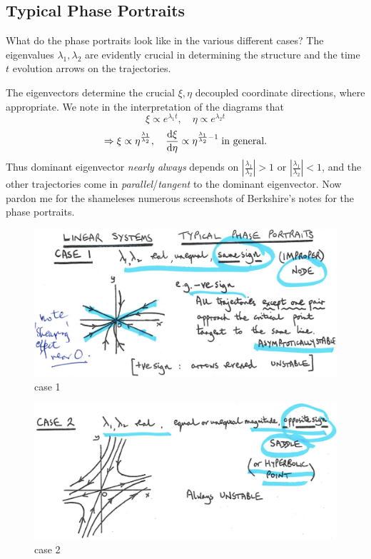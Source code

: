 \documentclass[12pt]{report}
\theoremstyle{definition}
\begin{document}
\subsection{Typical Phase Portraits}

What do the phase portraits look like in the various different cases?
The eigenvalues $\lambda_1, \lambda_2$ are evidently crucial in determining the structure
and the time $t$ evolution arrows on the trajectories.

The eigenvectors determine the crucial $\xi, \eta$ decoupled coordinate directions,
where appropriate. We note in the interpretation of the diagrams that\[
    \xi \propto e^{\lambda_1 t},\quad \eta \propto e^{\lambda_2 t}
\]\[
\Rightarrow{}\xi \propto \eta^{\frac{\lambda_1}{\lambda_2}},\quad
\frac{\mathrm{d}\xi}{\mathrm{d}\eta} \propto \eta^{\frac{\lambda_1}{\lambda_2} - 1}
\;\textnormal{in general}.
\]
Thus dominant eigenvector \emph{nearly always} depends on 
$\left|\frac{\lambda_1}{\lambda_2}\right| > 1$ or $\left|\frac{\lambda_1}{\lambda_2}\right| < 1$,
and the other trajectories come in \emph{parallel}/\emph{tangent} to the dominant eigenvector.  
Now pardon me for the shameleses numerous screenshots of Berkshire's notes for the phase portraits.

\begin{figure}
  	\includegraphics[scale=0.15]{PP1.jpeg}
  	\centering
  	\caption{case 1}\label{PP1}
\end{figure}

\begin{figure}
  	\includegraphics[scale=0.15]{PP2.jpeg}
  	\centering
  	\caption{case 2}\label{PP2}
\end{figure}
\end{document}
